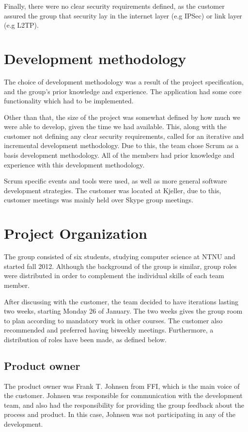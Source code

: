 Finally, there were no clear security requirements defined, as the customer assured the group that security lay in the internet layer (e.g IPSec) or link layer (e.g L2TP).

\section{Development methodology}

The choice of development methodology was a result of the project specification, and the group's prior knowledge and experience. The application had some core functionality which had to be implemented.

Other than that, the size of the project was somewhat defined by how much we were able to develop, given the time we had available. This, along with the customer not defining any clear security requirements, called for an iterative and incremental development methodology. Due to this, the team chose Scrum as a basis development methodology. All of the members had prior knowledge and experience with this development methodology.

Scrum specific events and tools were used, as well as more general software development strategies. The customer was located at Kjeller, due to this, customer meetings was mainly held over Skype group meetings.

\section{Project Organization}

The group consisted of six students, studying computer science at NTNU and started fall 2012. Although the background of the group is similar, group roles were distributed in order to complement the individual skills of each team member.

After discussing with the customer, the team decided to have iterations lasting two weeks, starting Monday 26 of January. The two weeks gives the group room to plan according to mandatory work in other courses. The customer also recommended and preferred having biweekly meetings. Furthermore, a distribution of roles have been made, as defined below. 

\subsection{Product owner}

The product owner was Frank T. Johnsen from FFI, which is the main voice of the customer. Johnsen was responsible for communication with the development team, and also had the responsibility for providing the group feedback about the process and product. In this case, Johnsen was not participating in any of the development.

